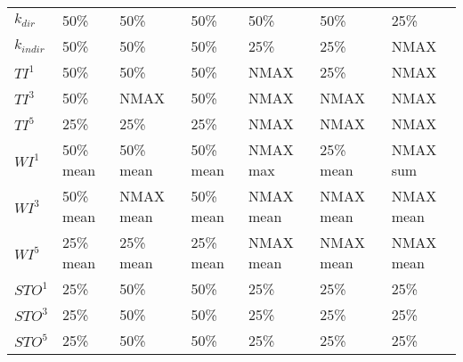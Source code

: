 \begin{table}[ht]
\begin{tabular}{lllllll}
\(\displaystyle k_{dir} \) &   {\color[HTML]{00D768} 50\% } & {\color[HTML]{EF2A00} 50\% } & {\color[HTML]{0051D7} 50\% } & {\color{orange} 50\% } & {\color[HTML]{6200D7} 50\% } & {\color[HTML]{9B9B9B} 25\% } \\
\(\displaystyle k_{indir} \) &   {\color[HTML]{EF2A00} 50\% } & {\color[HTML]{00D768} 50\% } & {\color[HTML]{0051D7} 50\% } & {\color[HTML]{6200D7} 25\% } & {\color{orange} 25\% } & {\color[HTML]{9B9B9B} NMAX } \\
\(\displaystyle TI^1 \) &   {\color[HTML]{EF2A00} 50\% } & {\color[HTML]{00D768} 50\% } & {\color[HTML]{0051D7} 50\% } & {\color[HTML]{6200D7} NMAX } & {\color{orange} 25\% } & {\color[HTML]{9B9B9B} NMAX } \\
\(\displaystyle TI^3 \) &   {\color[HTML]{EF2A00} 50\% } & {\color[HTML]{00D768} NMAX } & {\color[HTML]{0051D7} 50\% } & {\color{orange} NMAX } & {\color[HTML]{6200D7} NMAX } & {\color[HTML]{9B9B9B} NMAX } \\
\(\displaystyle TI^5 \) &   {\color[HTML]{EF2A00} 25\% } & {\color[HTML]{00D768} 25\% } & {\color[HTML]{0051D7} 25\% } & {\color{orange} NMAX } & {\color[HTML]{6200D7} NMAX } & {\color[HTML]{9B9B9B} NMAX } \\
\(\displaystyle WI^1 \) &   {\color[HTML]{EF2A00} 50\% mean} & {\color[HTML]{00D768} 50\% mean} & {\color[HTML]{0051D7} 50\% mean} & {\color[HTML]{6200D7} NMAX max} & {\color{orange} 25\% mean} & {\color[HTML]{9B9B9B} NMAX sum} \\
\(\displaystyle WI^3 \) &   {\color[HTML]{EF2A00} 50\% mean} & {\color[HTML]{00D768} NMAX mean} & {\color[HTML]{0051D7} 50\% mean} & {\color{orange} NMAX mean} & {\color[HTML]{6200D7} NMAX mean} & {\color[HTML]{9B9B9B} NMAX mean} \\
\(\displaystyle WI^5 \) &   {\color[HTML]{EF2A00} 25\% mean} & {\color[HTML]{00D768} 25\% mean} & {\color[HTML]{0051D7} 25\% mean} & {\color{orange} NMAX mean} & {\color[HTML]{6200D7} NMAX mean} & {\color[HTML]{9B9B9B} NMAX mean} \\
\(\displaystyle STO^1 \) &   {\color[HTML]{00D768} 25\% } & {\color[HTML]{EF2A00} 50\% } & {\color[HTML]{0051D7} 50\% } & {\color{orange} 25\% } & {\color[HTML]{6200D7} 25\% } & {\color[HTML]{9B9B9B} 25\% } \\
\(\displaystyle STO^3 \) &   {\color[HTML]{00D768} 25\% } & {\color[HTML]{EF2A00} 50\% } & {\color[HTML]{0051D7} 50\% } & {\color{orange} 25\% } & {\color[HTML]{6200D7} 25\% } & {\color[HTML]{9B9B9B} 25\% } \\
\(\displaystyle STO^5 \) &   {\color[HTML]{00D768} 25\% } & {\color[HTML]{EF2A00} 50\% } & {\color[HTML]{0051D7} 50\% } & {\color[HTML]{6200D7} 25\% } & {\color{orange} 25\% } & {\color[HTML]{9B9B9B} 25\% } \\

\end{tabular}
\end{table}
